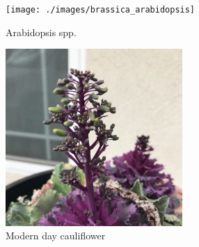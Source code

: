 \documentclass[11pt,ignorenonframetext,aspectratio=169]{beamer}
\begin{document}
\begin{frame}{}
\protect\hypertarget{section-9}{}
\begin{figure}
\texttt{[image: ./images/brassica\_arabidopsis]} \caption{Arabidopsis spp.}\label{fig:wild-brassica}
\end{figure}

\begin{figure}
\includegraphics[width=0.6\textwidth, keepaspectratio,height=0.45\textheight]{./images/Ornamental_cabbage} \caption{Modern day cauliflower}\label{fig:modern-brassica}
\end{figure}
\end{frame}
\end{document}
